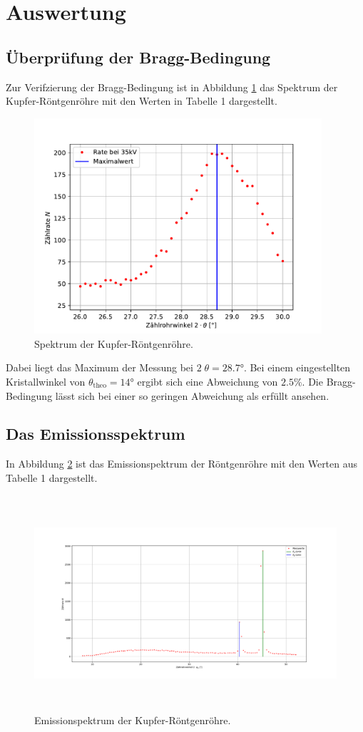 \section{Auswertung}

\subsection{Überprüfung der Bragg-Bedingung}
Zur Verifzierung der Bragg-Bedingung ist in Abbildung \ref{fig:Bragg} das Spektrum der Kupfer-Röntgenröhre mit den Werten in Tabelle 1 dargestellt.

\begin{figure}[H]
    \centering
    \includegraphics[height=8cm]{Auswertung/Bragg.pdf}
    \caption{Spektrum der Kupfer-Röntgenröhre.}
    \label{fig:Bragg}
\end{figure}

Dabei liegt das Maximum der Messung bei $2 \; \theta = 28.7°$.
Bei einem eingestellten Kristallwinkel von $\theta_\text{theo} = 14°$ ergibt sich eine Abweichung von $2.5\%$.
Die Bragg-Bedingung lässt sich bei einer so geringen Abweichung als erfüllt ansehen.

\subsection{Das Emissionsspektrum}
In Abbildung \ref{fig:Emission} ist das Emissionspektrum der Röntgenröhre mit den Werten aus Tabelle 1 dargestellt.

\begin{figure}[H]
    \centering
    \includegraphics[height=8cm]{Auswertung/Emission.pdf}
    \caption{Emissionspektrum der Kupfer-Röntgenröhre.}
    \label{fig:Emission}
\end{figure}

